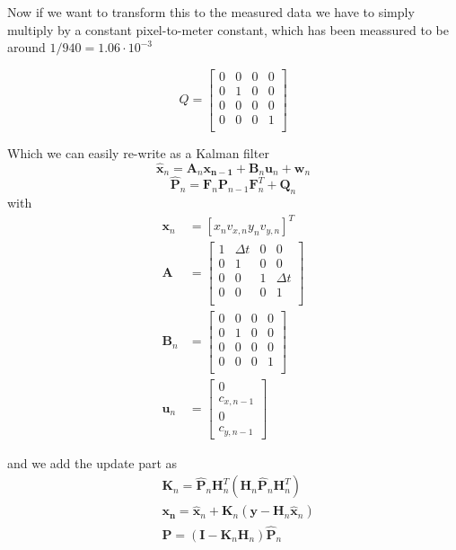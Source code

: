 	Now if we want to transform this to the measured data we have to simply multiply by a constant pixel-to-meter constant, which has been meassured to be around $1/940=1.06\cdot 10^{-3}$
	
	\begin{equation}
	Q = 
	 \begin{bmatrix}
	  0 & 	0 & 	0 & 	0 \\
	   0 & 	1 &		0 & 	0 \\
	   0 & 	0 & 	0 &    	0 \\
	   0 & 	0 & 	0 & 	1 \\
	  \end{bmatrix}
	\end{equation}
	
	Which we can easily re-write as a Kalman filter 
	\begin{equation}
	\hat{\mathbf{x}}_{n} = \mathbf{A}_n\mathbf{x_{n-1}} + \mathbf{B}_n \mathbf{u}_n + \mathbf{w}_n
	\end{equation}
	\begin{equation}
	\hat{\mathbf{P}}_n = \mathbf{F}_n \mathbf{P}_{n-1} \mathbf{F}^{T}_{n} + \mathbf{Q}_n
	\end{equation}
	with 
	\begin{eqnarray}
	\mathbf{x}_n &= 
	\left[
	x_n 
	v_{x,n} 
	y_n 
	v_{y,n}
	\right]^T \\
	\mathbf{A} &= 
	\begin{bmatrix}
	  1 & 	\Delta t & 	0 & 	0 \\
	  0 & 	1 & 	0 & 		0 \\
	  0 & 	0 & 	1 & \Delta t  \\
	  0 & 	0 & 	0 & 		1 \\
	\end{bmatrix} \\
	\mathbf{B}_n &= 
	 \begin{bmatrix}
	   0 & 	0 & 	0 & 	0 \\
	   0 & 	1 &		0 & 	0 \\
	   0 & 	0 & 	0 &    	0 \\
	   0 & 	0 & 	0 & 	1 \\
	  \end{bmatrix}
	\\
	\mathbf{u}_n &=
	\left[
	  \begin{array}{c}
	  0 \\
	  c_{x,n-1} \\
	  0 \\
	  c_{y,n-1}
	  \end{array}
	  \right] 
	\end{eqnarray}
	
	and we add the update part as
	\begin{eqnarray}
	&\mathbf{K}_n = \hat{\mathbf{P}}_n \mathbf{H}^T_n(\mathbf{H}_n \hat{\mathbf{P}}_n \mathbf{H}^T_n	) \\
	&\mathbf{x_n} = \hat{\mathbf{x}}_n + \mathbf{K}_n(\mathbf{y} - \mathbf{H}_n\hat{\mathbf{x}}_n) \\
	&\mathbf{P}   = (\mathbf{I} - \mathbf{K}_n\mathbf{H}_n)\hat{\mathbf{P}}_n
	\end{eqnarray}
	
	
	
	
	